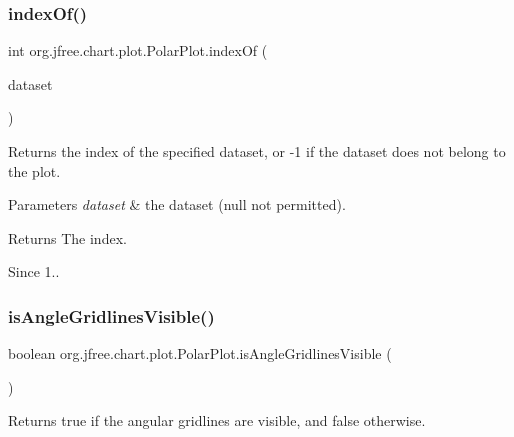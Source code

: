 \subsubsection{\texorpdfstring{index\+Of()}{indexOf()}}
{\footnotesize\ttfamily int org.\+jfree.\+chart.\+plot.\+Polar\+Plot.\+index\+Of (\begin{DoxyParamCaption}\item[{\mbox{\hyperlink{interfaceorg_1_1jfree_1_1data_1_1xy_1_1_x_y_dataset}{X\+Y\+Dataset}}}]{dataset }\end{DoxyParamCaption})}

Returns the index of the specified dataset, or {\ttfamily -\/1} if the dataset does not belong to the plot.


\begin{DoxyParams}{Parameters}
{\em dataset} & the dataset ({\ttfamily null} not permitted).\\
\hline
\end{DoxyParams}
\begin{DoxyReturn}{Returns}
The index.
\end{DoxyReturn}
\begin{DoxySince}{Since}
1.. 
\end{DoxySince}
\mbox{\label{classorg_1_1jfree_1_1chart_1_1plot_1_1_polar_plot_ad7bfe305f21e04763265a67ef06fffac}} 
\subsubsection{\texorpdfstring{is\+Angle\+Gridlines\+Visible()}{isAngleGridlinesVisible()}}
{\footnotesize\ttfamily boolean org.\+jfree.\+chart.\+plot.\+Polar\+Plot.\+is\+Angle\+Gridlines\+Visible (\begin{DoxyParamCaption}{ }\end{DoxyParamCaption})}

Returns {\ttfamily true} if the angular gridlines are visible, and {\ttfamily false} otherwise.

